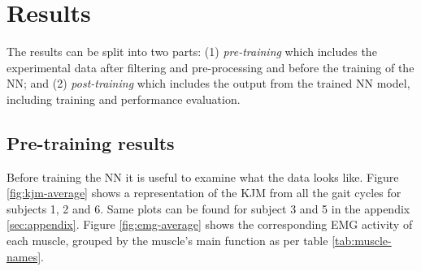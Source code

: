 \documentclass[../main.tex]{subfiles}
\begin{document}
\chapter{Results}
\label{sec:results}
The results can be split into two parts: (1) \textit{pre-training} which includes the experimental data after filtering and pre-processing and before the training of the \ac{NN}; and (2) \textit{post-training} which includes the output from the trained \ac{NN} model, including training and performance evaluation.

\section{Pre-training results}
\label{sec:results_pre-training-results}
Before training the \ac{NN} it is useful to examine what the data looks like.
Figure \ref{fig:kjm-average} shows a representation of the \ac{KJM} from all the gait cycles for subjects 1, 2 and 6.
Same plots can be found for subject 3 and 5 in the appendix \ref{sec:appendix}. 
Figure \ref{fig:emg-average} shows the corresponding \ac{EMG} activity of each muscle, grouped by the muscle's main function as per table \ref{tab:muscle-names}.
\end{document}
